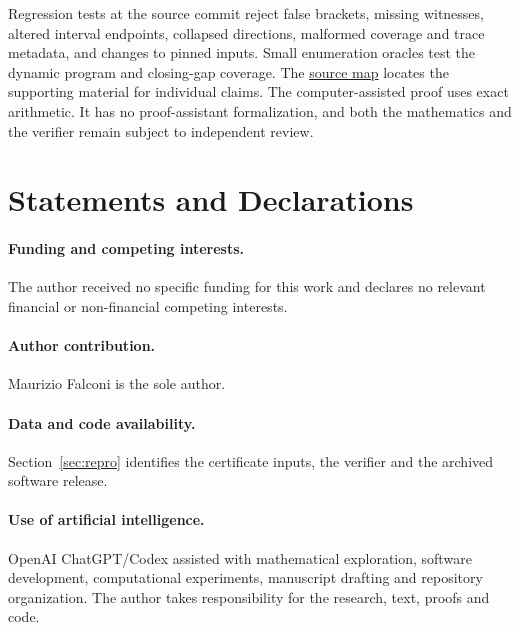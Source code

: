 \documentclass[11pt]{article}
\theoremstyle{definition}
\theoremstyle{remark}
\begin{document}
Regression tests at the source commit reject false brackets, missing
witnesses, altered interval endpoints, collapsed directions, malformed
coverage and trace metadata, and changes to pinned inputs. Small
enumeration oracles test the dynamic program and closing-gap coverage.
The \href{https://github.com/falker47/ringmin/blob/4b3721df8061f1992cfd242df69b1a0643216d8f/paper_assets/journal_dcg/SOURCE_MAP.md}{source map}
locates the supporting material for individual claims.
The computer-assisted proof uses exact arithmetic. It has no
proof-assistant formalization, and both the mathematics and the verifier
remain subject to independent review.

\section*{Statements and Declarations}
\paragraph{Funding and competing interests.} The author received no
specific funding for this work and declares no relevant financial or
non-financial competing interests.
\paragraph{Author contribution.} Maurizio Falconi is the sole author.
\paragraph{Data and code availability.} Section~\ref{sec:repro} identifies
the certificate inputs, the verifier and the archived software release.
\paragraph{Use of artificial intelligence.} OpenAI ChatGPT/Codex assisted
with mathematical exploration, software development, computational
experiments, manuscript drafting and repository organization. The author
takes responsibility for the research, text, proofs and code.

\appendix

\end{document}
